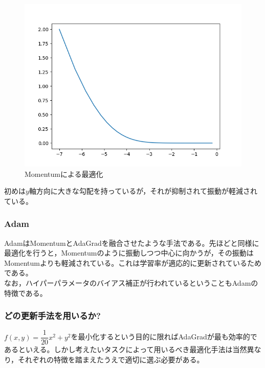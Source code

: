 \documentclass{jarticle}
\begin{document}
\begin{figure}[htbp]
	\begin{center}
		\includegraphics[scale = 0.5]{test3.png}
		\caption{Momentumによる最適化}
		\label{test3}
	\end{center}
\end{figure}
初めは$y$軸方向に大きな勾配を持っているが，それが抑制されて振動が軽減されている。
\subsubsection{Adam}
AdamはMomentumとAdaGradを融合させたような手法である。先ほどと同様に最適化を行うと，Momentumのように振動しつつ中心に向かうが，その振動はMomentumよりも軽減されている。これは学習率が適応的に更新されているためである。\\
なお，ハイパーパラメータのバイアス補正が行われているということもAdamの特徴である。
\subsubsection{どの更新手法を用いるか?}
$f(x,y) = \dfrac{1}{20} x^2 + y^2$を最小化するという目的に限ればAdaGradが最も効率的であるといえる。しかし考えたいタスクによって用いるべき最適化手法は当然異なり，それぞれの特徴を踏まえたうえで適切に選ぶ必要がある。
\end{document}
